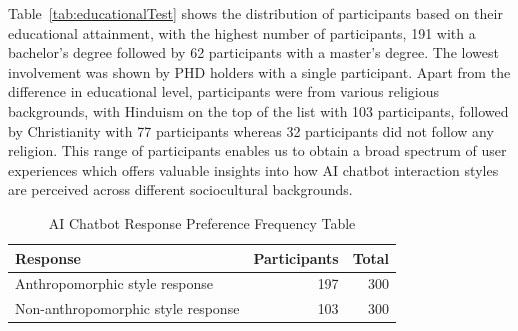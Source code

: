 \documentclass[conference]{IEEEtran}
\begin{document}
Table~\ref{tab:educationalTest} shows the distribution of participants based on their educational attainment, with the highest number of participants, 191 with a bachelor’s degree followed by 62 participants with a master’s degree. The lowest involvement was shown by PHD holders with a single participant. Apart from the difference in educational level, participants were from various religious backgrounds, with Hinduism on the top of the list with 103 participants, followed by Christianity with 77 participants whereas 32 participants did not follow any religion. This range of participants enables us to obtain a broad spectrum of user experiences which offers valuable insights into how AI chatbot interaction styles are perceived across different sociocultural backgrounds.

\begin{table}[ht]
    \centering
    \caption{AI Chatbot Response Preference Frequency Table}
    \label{tab:anthropomorphicTest}
    \begin{tabular}{lrr}
        \toprule
        \textbf{Response} & \textbf{Participants} & \textbf{Total} \\
        \midrule
        Anthropomorphic style response & 197 & 300 \\
		Non-anthropomorphic style response & 103 & 300 \\
        \bottomrule
    \end{tabular}
\end{table}
\end{document}
